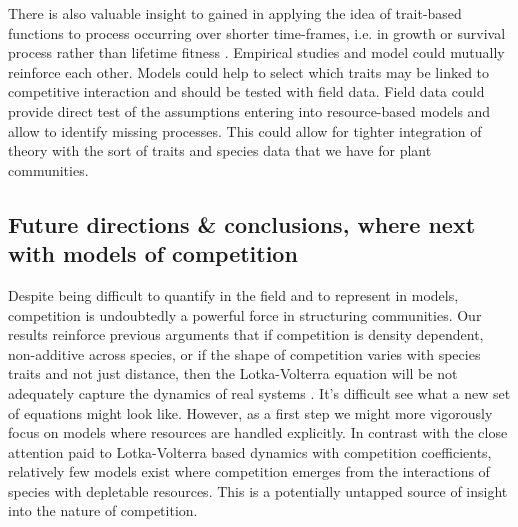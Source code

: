 \documentclass[a4paper,11pt]{article}
\begin{document}
There is also valuable insight to gained in applying the idea of trait-based functions to process occurring over shorter time-frames, i.e. in growth or survival process rather than lifetime fitness
\citep[e.g.][]{Kunstler-2012, Lasky-2015, Kraft-2015}.
Empirical studies and model could mutually reinforce each other. Models could help to select which traits may be linked to competitive interaction and should be tested with field data. Field data could provide direct test of the assumptions entering into resource-based models and allow to identify missing processes. This could allow for tighter integration of theory with the sort of traits and species data that we have for plant communities.

\subsection{Future directions \& conclusions, where next with models of competition}

Despite being difficult to quantify in the field and to represent in models, competition is undoubtedly a powerful force in structuring communities.
%
Our results reinforce previous arguments that if competition is density dependent, non-additive across species, or if the shape of competition varies with species traits and not just distance, then the
Lotka-Volterra equation will be not adequately capture the dynamics of real systems \citep{Andrewartha-1953, Neill-1974, Abrams-1975,
  Wangersky-1978,Abrams-1980, Tilman-1987}.
It's difficult see what a new set of equations might look like.
However, as a first step we might more vigorously focus on models where resources are handled explicitly.
In contrast with the close attention paid to Lotka-Volterra based dynamics with competition coefficients,
relatively few models exist where competition emerges from the interactions of species with depletable resources. This is a potentially untapped source of insight into the nature of competition.
\end{document}
